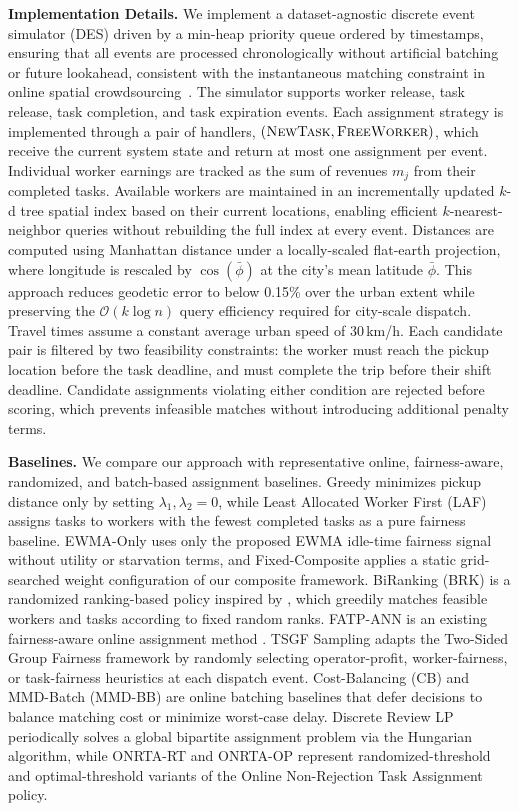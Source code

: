 \textbf{Implementation Details.}
\label{sec:framework}
We implement a dataset-agnostic discrete event simulator (DES) driven by a min-heap priority queue ordered by timestamps, ensuring that all events are processed chronologically without artificial batching or future lookahead, consistent with the instantaneous matching constraint in online spatial crowdsourcing~\cite{tong2019survey}. The simulator supports worker release, task release, task completion, and task expiration events. Each assignment strategy is implemented through a pair of handlers, $(\textsc{NewTask}, \textsc{FreeWorker})$, which receive the current system state and return at most one assignment per event. Individual worker earnings are tracked as the sum of revenues $m_j$ from their completed tasks. Available workers are maintained in an incrementally updated $k$-d tree spatial index based on their current locations, enabling efficient $k$-nearest-neighbor queries without rebuilding the full index at every event. Distances are computed using Manhattan distance under a locally-scaled flat-earth projection, where longitude is rescaled by $\cos(\bar{\phi})$ at the city's mean latitude $\bar{\phi}$. This approach reduces geodetic error to below 0.15\% over the urban extent while preserving the $\mathcal{O}(k \log n)$ query efficiency required for city-scale dispatch. Travel times assume a constant average urban speed of 30\,km/h. Each candidate pair is filtered by two feasibility constraints: the worker must reach the pickup location before the task deadline, and must complete the trip before their shift deadline. Candidate assignments violating either condition are rejected before scoring, which prevents infeasible matches without introducing additional penalty terms.


\textbf{Baselines.}
We compare our approach with representative online, fairness-aware, randomized, and batch-based assignment baselines. Greedy minimizes pickup distance only by setting $\lambda_1,\lambda_2=0$, while Least Allocated Worker First (LAF) assigns tasks to workers with the fewest completed tasks as a pure fairness baseline. EWMA-Only uses only the proposed EWMA idle-time fairness signal without utility or starvation terms, and Fixed-Composite applies a static grid-searched weight configuration of our composite framework. BiRanking (BRK) is a randomized ranking-based policy inspired by \cite{[CITATION]}, which greedily matches feasible workers and tasks according to fixed random ranks. FATP-ANN is an existing fairness-aware online assignment method \cite{CR-08}. TSGF Sampling adapts the Two-Sided Group Fairness framework \cite{[CITATION]} by randomly selecting operator-profit, worker-fairness, or task-fairness heuristics at each dispatch event. Cost-Balancing (CB) \cite{[CITATION]} and MMD-Batch (MMD-BB) \cite{CR-11} are online batching baselines that defer decisions to balance matching cost or minimize worst-case delay. Discrete Review LP \cite{[CITATION]} periodically solves a global bipartite assignment problem via the Hungarian algorithm, while ONRTA-RT and ONRTA-OP \cite{[CITATION]} represent randomized-threshold and optimal-threshold variants of the Online Non-Rejection Task Assignment policy.


